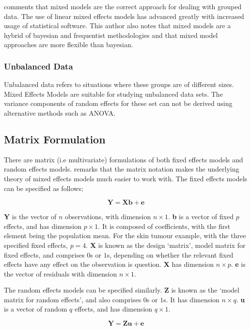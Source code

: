 \documentclass[12pt, a4paper]{report}
\begin{document}
\citet{Demi} comments that mixed models are the correct approach
for dealing with grouped data. The use of linear mixed effects
models has advanced greatly with increased usage of statistical
software. This author also notes that mixed models are a hybrid of
bayesian and frequentist methodologies and that mixed model
approaches are more flexible than bayesian.


\subsubsection{Unbalanced Data} Unbalanced data refers to situations where these groups are
of different sizes. Mixed Effects Models are suitable for studying
unbalanced data sets. The variance components of random effects
for these set can not be derived using alternative methods such as
ANOVA.

\subsection{Matrix Formulation} There are matrix (i.e multivariate)
formulations of both fixed effects models and random effects
models. \citet{BrownPrescott} remarks that the matrix notation
makes the underlying theory of mixed effects models much easier to
work with. The fixed effects models can be specified as follows;

\begin{equation}
\textbf{Y} = \textbf{Xb} + \textbf{e}
\end{equation}

\textbf{Y} is the vector of $n$ observations, with dimension $n
\times 1$. \textbf{b} is a vector of fixed $p$ effects, and has
dimension $p \times 1$. It is composed of coefficients, with the
first element being the population mean. For the skin tumour
example, with the three specified fixed effects, $p=4$. \textbf{X}
is known as the design `matrix', model matrix for fixed effects,
and comprises $0$s or $1$s, depending on whether the relevant
fixed effects have any effect on the observation is question.
\textbf{X} has dimension $n \times p$. \textbf{e} is the vector of
residuals with dimension $n \times 1$.

The random effects models can be specified similarly. \textbf{Z}
is known as the `model matrix for random effects', and also
comprises $0$s or $1$s. It has dimension $n \times q$. \textbf{u}
is a vector of random $q$ effects, and has dimension $q \times 1$.

\begin{equation}
\textbf{Y} = \textbf{Zu} + \textbf{e}
\end{equation}
\end{document}
